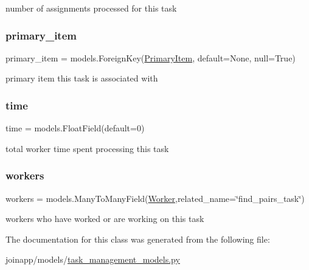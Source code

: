 number of assignments processed for this task 

\mbox{\label{classjoinapp_1_1models_1_1task__management__models_1_1_find_pairs_task_aba1ada8f72cc448a543f1b01551172fa}} 
\subsubsection{\texorpdfstring{primary\_item}{primary\_item}}
{\footnotesize\ttfamily primary\+\_\+item = models.\+Foreign\+Key(\textquotesingle{}\mbox{\hyperlink{classjoinapp_1_1models_1_1items_1_1_primary_item}{Primary\+Item}}\textquotesingle{}, default=None, null=True)\hspace{0.3cm}{\ttfamily [static]}}



primary item this task is associated with 

\mbox{\label{classjoinapp_1_1models_1_1task__management__models_1_1_find_pairs_task_a70c092a6aebace0b1ea406e14da78a40}} 
\subsubsection{\texorpdfstring{time}{time}}
{\footnotesize\ttfamily time = models.\+Float\+Field(default=0)\hspace{0.3cm}{\ttfamily [static]}}



total worker time spent processing this task 

\mbox{\label{classjoinapp_1_1models_1_1task__management__models_1_1_find_pairs_task_a42a0cd7f4a34b940f08fd182458c9aba}} 
\subsubsection{\texorpdfstring{workers}{workers}}
{\footnotesize\ttfamily workers = models.\+Many\+To\+Many\+Field(\mbox{\hyperlink{classjoinapp_1_1models_1_1task__management__models_1_1_worker}{Worker}},related\+\_\+name=\char`\"{}find\+\_\+pairs\+\_\+task\char`\"{})\hspace{0.3cm}{\ttfamily [static]}}



workers who have worked or are working on this task 



The documentation for this class was generated from the following file\+:\begin{DoxyCompactItemize}
\item 
joinapp/models/\mbox{\hyperlink{task__management__models_8py}{task\+\_\+management\+\_\+models.\+py}}\end{DoxyCompactItemize}

